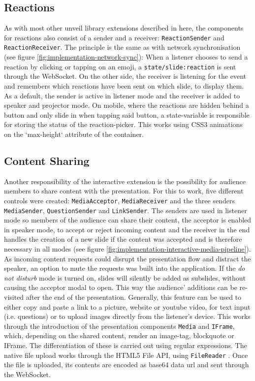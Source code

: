 \subsection{Reactions}
\label{sec:implementation-interactive-reactions}
As with most other unveil library extensions described in here, the components for reactions also consist of a sender and a receiver: \texttt{ReactionSender} and \texttt{ReactionReceiver}. The principle is the same as with network synchronisation (see figure \ref{fig:implementation-network-sync}): When a listener chooses to send a reaction by clicking or tapping on an emoji, a \texttt{state/slide:reaction} is sent through the WebSocket. On the other side, the receiver is listening for the event and remembers which reactions have been sent on which slide, to display them. As a default, the sender is active in listener mode and the receiver is added to speaker and projector mode. On mobile, where the reactions are hidden behind a button and only slide in when tapping said button, a state-variable is responsible for storing the status of the reaction-picker. This works using CSS3 animations on the `max-height` attribute of the container.

\subsection{Content Sharing}
\label{sec:implementation-interactive-media}
Another responsibility of the interactive extension is the possibility for audience members to share content with the presentation. For this to work, five different controls were created: \texttt{MediaAcceptor}, \texttt{MediaReceiver} and the three senders \texttt{MediaSender}, \texttt{QuestionSender} and \texttt{LinkSender}. The senders are used in listener mode so members of the audience can share their content, the acceptor is enabled in speaker mode, to accept or reject incoming content and the receiver in the end handles the creation of a new slide if the content was accepted and is therefore necessary in all modes (see figure \ref{fig:implementation-interactive-media-pipeline}). As incoming content requests could disrupt the presentation flow and distract the speaker, an option to mute the requests was built into the application. If the \emph{do not disturb} mode is turned on, slides will silently be added as subslides, without causing the acceptor modal to open. This way the audience' additions can be re-visited after the end of the presentation. Generally, this feature can be used to either copy and paste a link to a picture, website or youtube video, for text input (i.e. questions) or to upload images directly from the listener's device. This works through the introduction of the presentation components \texttt{Media} and \texttt{IFrame}, which, depending on the shared content, render an image-tag, blockquote or IFrame. The differentiation of these is carried out using regular expressions. The native file upload works through the HTML5 File API, using \texttt{FileReader} \cite{file-api}. Once the file is uploaded, its contents are encoded as base64 data url and sent through the WebSocket.

